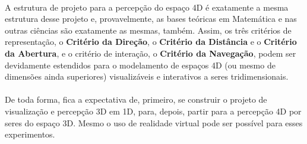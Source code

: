 \documentclass{article}
\begin{document}
	\paragraph{}
	A estrutura de projeto para a percepção do espaço 4D é exatamente a mesma estrutura desse projeto e, provavelmente, as bases teóricas em Matemática e nas outras ciências são exatamente as mesmas, também. Assim, os três critérios de representação, o \textbf{Critério da Direção}, o \textbf{Critério da Distância} e o \textbf{Critério da Abertura}, e o critério de interação, o \textbf{Critério da Navegação}, podem ser devidamente estendidos para o modelamento de espaços 4D (ou mesmo de dimensões ainda superiores) visualizáveis e interativos a seres tridimensionais. 
	
	\paragraph{}
	De toda forma, fica a expectativa de, primeiro, se construir o projeto de visualização e percepção 3D em 1D, para, depois, partir para a percepção 4D por seres do espaço 3D. Mesmo o uso de realidade virtual pode ser possível para esses experimentos.
		
	
	
\end{document}
